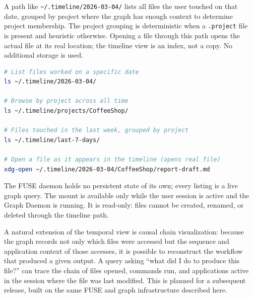 A path like \texttt{\textasciitilde/.timeline/2026-03-04/} lists all files the
user touched on that date, grouped by project where the graph has enough
context to determine project membership. The project grouping is deterministic
when a \texttt{.project} file is present and heuristic otherwise. Opening a
file through this path opens the actual file at its real location; the timeline
view is an index, not a copy. No additional storage is used.

\begin{lstlisting}[language=bash, caption={Temporal filesystem view examples}]
# List files worked on a specific date
ls ~/.timeline/2026-03-04/

# Browse by project across all time
ls ~/.timeline/projects/CoffeeShop/

# Files touched in the last week, grouped by project
ls ~/.timeline/last-7-days/

# Open a file as it appears in the timeline (opens real file)
xdg-open ~/.timeline/2026-03-04/CoffeeShop/report-draft.md
\end{lstlisting}

The FUSE daemon holds no persistent state of its own; every listing is a live
graph query. The mount is available only while the user session is active and
the Graph Daemon is running. It is read-only: files cannot be created, renamed,
or deleted through the timeline path.

A natural extension of the temporal view is causal chain visualization:
because the graph records not only which files were accessed but the sequence
and application context of those accesses, it is possible to reconstruct the
workflow that produced a given output. A query asking ``what did I do to produce
this file?'' can trace the chain of files opened, commands run, and applications
active in the session where the file was last modified. This is planned for a
subsequent release, built on the same FUSE and graph infrastructure described
here.

